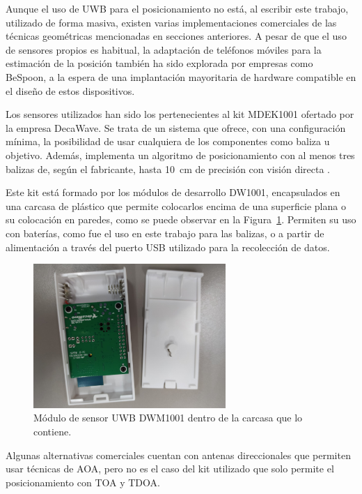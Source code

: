 Aunque el uso de UWB para el posicionamiento no está, al escribir este trabajo, utilizado de forma masiva, existen varias implementaciones comerciales de las técnicas geométricas mencionadas en secciones anteriores.
A pesar de que el uso de sensores propios es habitual, la adaptación de teléfonos móviles para la estimación de la posición también ha sido explorada por empresas como BeSpoon, a la espera de una implantación mayoritaria de hardware compatible en el diseño de estos dispositivos.

Los sensores utilizados han sido los pertenecientes al kit MDEK1001 ofertado por la empresa DecaWave.
Se trata de un sistema que ofrece, con una configuración mínima, la posibilidad de usar cualquiera de los componentes como baliza u objetivo.
Además, implementa un algoritmo de posicionamiento con al menos tres balizas de, según el fabricante, hasta 10~cm de precisión con visión directa \cite{Decawave}.

Este kit está formado por los módulos de desarrollo DW1001, encapsulados en una carcasa de plástico que permite colocarlos encima de una superficie plana o su colocación en paredes, como se puede observar en la Figura~\ref{fig:sensor_UWB}.
Permiten su uso con baterías, como fue el uso en este trabajo para las balizas, o a partir de alimentación a través del puerto USB utilizado para la recolección de datos.

\begin{figure}[H]
    \centering
    \includegraphics[width=0.65\textwidth]{pic/sensor_abierto.jpg}
    \caption{Módulo de sensor UWB DWM1001 dentro de la carcasa que lo contiene.}
    \label{fig:sensor_UWB}
\end{figure}

Algunas alternativas comerciales cuentan con antenas direccionales que permiten usar técnicas de AOA, pero no es el caso del kit utilizado que solo permite el posicionamiento con TOA y TDOA.

